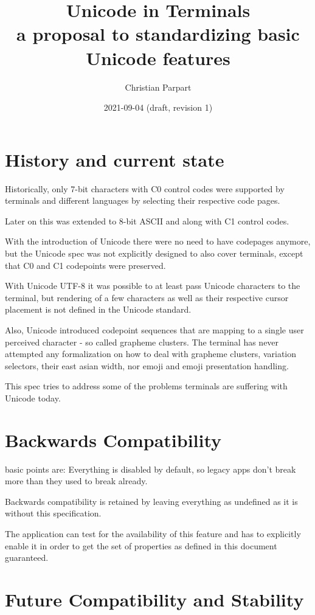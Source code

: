 \documentclass{article}
\title{Unicode in Terminals \\
a proposal to standardizing basic Unicode features}
\author{Christian Parpart}
\date{2021-09-04 (draft, revision 1)}
\begin{document}
\maketitle

\tableofcontents

\section{History and current state}

Historically, only 7-bit characters with C0 control codes
were supported by terminals and different languages
by selecting their respective code pages.

Later on this was extended to 8-bit ASCII and along with C1 control codes.

With the introduction of Unicode there were no need to have codepages anymore,
but the Unicode spec was not explicitly designed to also cover terminals,
except that C0 and C1 codepoints were preserved.

With Unicode UTF-8 it was possible to at least pass Unicode characters to the
terminal, but rendering of a few characters as well as their respective
cursor placement is not defined in the Unicode standard.

Also, Unicode introduced codepoint sequences that are mapping to
a single user perceived character - so called grapheme clusters.
The terminal has never attempted any formalization on how to deal with
grapheme clusters, variation selectors, their east asian width, nor
emoji and emoji presentation handling.

This spec tries to address some of the problems terminals are suffering
with Unicode today.

\section{Backwards Compatibility}

basic points are:
Everything is disabled by default, so legacy apps don't break more than they
used to break already.

Backwards compatibility is retained by leaving everything as undefined
as it is without this specification.

The application can test for the availability of this feature
and has to explicitly enable it in order to get the set of properties
as defined in this document guaranteed.

\section{Future Compatibility and Stability}
\end{document}
